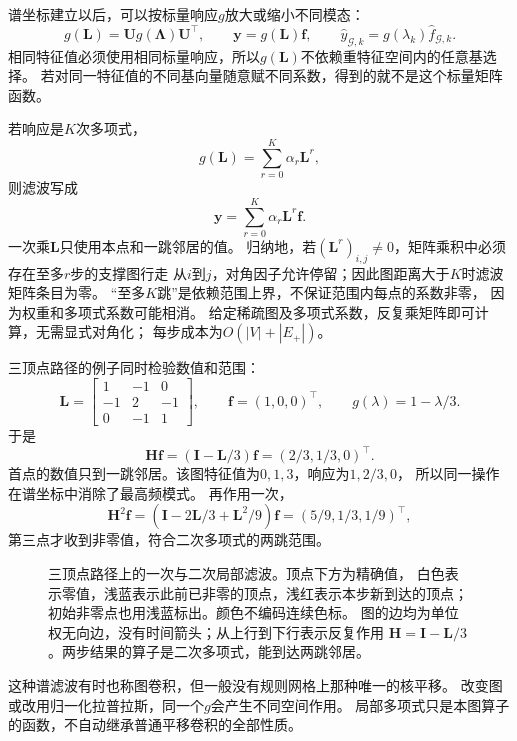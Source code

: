 谱坐标建立以后，可以按标量响应\(g\)放大或缩小不同模态：
\[
  g(\bm L)=\bm U g(\bm\Lambda)\bm U^\top,\qquad
  \bm y=g(\bm L)\bm f,\qquad
  \widehat y_{\mathcal G,k}=g(\lambda_k)\widehat f_{\mathcal G,k}.
\]
相同特征值必须使用相同标量响应，所以\(g(\bm L)\)不依赖重特征空间内的任意基选择。
若对同一特征值的不同基向量随意赋不同系数，得到的就不是这个标量矩阵函数。

若响应是\(K\)次多项式，
\begin{equation}
  g(\bm L)=\sum_{r=0}^K\alpha_r\bm L^r,
  \label{eq:graph-theory-polynomial-filter}
\end{equation}
则滤波写成
\begin{equation}
  \bm y=\sum_{r=0}^K\alpha_r\bm L^r\bm f.
  \label{eq:signal-analysis-polynomial-graph-filter}
\end{equation}
一次乘\(\bm L\)只使用本点和一跳邻居的值。
归纳地，若\((\bm L^r)_{i,j}\neq0\)，矩阵乘积中必须存在至多\(r\)步的支撑图行走
从\(i\)到\(j\)，对角因子允许停留；因此图距离大于\(K\)时滤波矩阵条目为零。
“至多\(K\)跳”是依赖范围上界，不保证范围内每点的系数非零，
因为权重和多项式系数可能相消。
给定稀疏图及多项式系数，反复乘矩阵即可计算，无需显式对角化；
每步成本为\(O(|V|+|E_+|)\)。

三顶点路径的例子同时检验数值和范围：
\[
  \bm L=
  \begin{bmatrix}1&-1&0\\-1&2&-1\\0&-1&1\end{bmatrix},\qquad
  \bm f=(1,0,0)^\top,\qquad g(\lambda)=1-\lambda/3.
\]
于是
\[
  \bm H\bm f=(\bm I-\bm L/3)\bm f=(2/3,1/3,0)^\top.
\]
首点的数值只到一跳邻居。该图特征值为\(0,1,3\)，响应为\(1,2/3,0\)，
所以同一操作在谱坐标中消除了最高频模式。
再作用一次，
\[
  \bm H^2\bm f
  =(\bm I-2\bm L/3+\bm L^2/9)\bm f=(5/9,1/3,1/9)^\top,
\]
第三点才收到非零值，符合二次多项式的两跳范围。

\begin{figure}[htbp]
  \centering
  
  \caption{三顶点路径上的一次与二次局部滤波。顶点下方为精确值，
  白色表示零值，浅蓝表示此前已非零的顶点，浅红表示本步新到达的顶点；
  初始非零点也用浅蓝标出。颜色不编码连续色标。
  图的边均为单位权无向边，没有时间箭头；从上行到下行表示反复作用
  \(\bm H=\bm I-\bm L/3\)。两步结果的算子是二次多项式，能到达两跳邻居。}
  \label{fig:graph-theory-polynomial-locality}
\end{figure}
\FloatBarrier

这种谱滤波有时也称图卷积，但一般没有规则网格上那种唯一的核平移。
改变图或改用归一化拉普拉斯，同一个\(g\)会产生不同空间作用。
局部多项式只是本图算子的函数，不自动继承普通平移卷积的全部性质。

